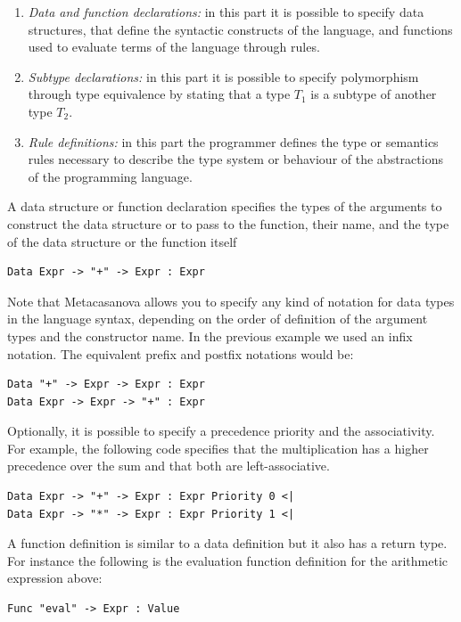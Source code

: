 \begin{enumerate}
	\item \textit{Data and function declarations:} in this part it is possible to specify data structures, that define the syntactic constructs of the language, and functions used to evaluate terms of the language through rules.
	\item \textit{Subtype declarations:} in this part it is possible to specify polymorphism through type equivalence by stating that a type $T_1$ is a subtype of another type $T_2$.
	\item \textit{Rule definitions:} in this part the programmer defines the type or semantics rules necessary to describe the type system or behaviour of the abstractions of the programming language.
\end{enumerate}

A data structure or function declaration specifies the types of the arguments to construct the data structure or to pass to the function, their name, and the type of the data structure or the function itself
\begin{lstlisting}
Data Expr -> "+" -> Expr : Expr
\end{lstlisting}

\noindent
Note that Metacasanova allows you to specify any kind of notation for data types in the language syntax, depending on the order of definition of the argument types and the constructor name. In the previous example we used an infix notation. The equivalent prefix and postfix notations would be:

\begin{lstlisting}
Data "+" -> Expr -> Expr : Expr
Data Expr -> Expr -> "+" : Expr
\end{lstlisting}

Optionally, it is possible to specify a precedence priority and the associativity. For example, the following code specifies that the multiplication has a higher precedence over the sum and that both are left-associative.

\begin{lstlisting}
Data Expr -> "+" -> Expr : Expr Priority 0 <|
Data Expr -> "*" -> Expr : Expr Priority 1 <|
\end{lstlisting}

\noindent
A function definition is similar to a data definition but it also has a return type. For instance the following is the evaluation function definition for the arithmetic expression above:

\begin{lstlisting}
Func "eval" -> Expr : Value
\end{lstlisting}


